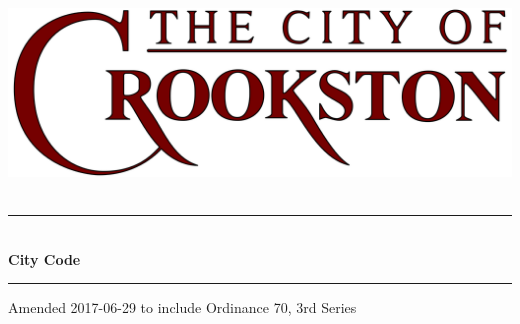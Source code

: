 \begin{titlepage}
\begin{center}

~\\[3cm]
\includegraphics[width=.75\textwidth]{./images/crookston_logo.png}~\\[2.5cm]

\hrule ~\\[0.4cm]
{\Huge\bfseries City Code}\\[0.4cm]
\hrule

\vfill

{\large Amended 2017-06-29 to include}
{\large Ordinance 70, 3rd Series}

\end{center}
\end{titlepage}
